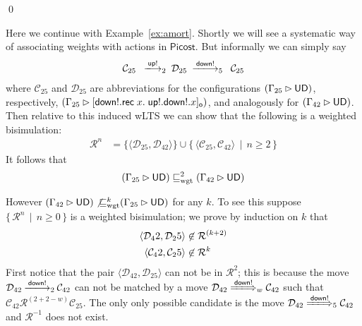 \documentclass{LMCS}
\newcommand{\pfn}[1]{\mathsf{#1}}  \newcommand{\cfn}[1]{\mathsf{#1}}  \newcommand{\ownfnt}[1]{{\mathsf{#1}}}
\newcommand{\picost}{\ensuremath{\pfn{Picost}}\xspace}
\newcommand{\with}{\mathbin \rhd}
\newcommand{\amort}[1]{\mathrel{\sqsubseteq_{\rm wgt}^{#1}}}
\def\pair(#1,#2){\langle #1 , #2 \rangle}\newcommand{\parrow}{ \mathbin{\rightharpoonup}}
\newcommand{\setof}[2]{\{ \, #1 \, \mid \, #2 \, \}}\newcommand{\sset}[1]{\{ {#1}  \}  }
\newcommand{\calR}{\mathbin{\mathcal{R}}}
\newcommand{\calC}{\mathcal{C}}
\newcommand{\calD}{\mathcal{D}}
\newcommand{\Crec}[2]{\pfn{rec}\;#1.\;#2}
\newcommand{\Cloc}[2]{[#1]_{\ownfnt{#2}}}
\newcommand{\ar}[1]{\mathbin{\xlongrightarrow{ #1}}}
\newcommand{\dar}[1]{\xLongrightarrow{\vspace{-2em}#1}}
\begin{document}
 \qed
\begin{exa}\label{def:amort.more}
  Here we continue with Example~\ref{ex:amort}. Shortly we will see a
  systematic way of associating weights with actions in \picost. But
  informally we can simply say
\begin{align*}
  \calC_{25} \;\; \ar{\Up!}_2 \;\calD_{25}\; \ar{\down!}_5 \;\;  \calC_{25} 
\end{align*}
where $\calC_{25}$ and $\calD_{25}$ are abbreviations for the configurations 
$ (\Gamma_{25} \with \UD)$, respectively,
$(\Gamma_{25} \with \Cloc{\down!.\Crec{x}{\Up!.\down!.x}}{o})$, 
and analogously for $(\Gamma_{42} \with \UD)$. Then relative to this induced 
wLTS we can show that the following is a weighted bisimulation:
\begin{align*}
  \calR^n &= \sset{\pair(\calD_{25},\calD_{42})} \cup 
             \setof{\pair(\calC_{25},\calC_{42})}{n \geq 2}
\end{align*}
It follows that
\begin{align*}
   (\Gamma_{25} \with \UD)  \amort{2} (\Gamma_{42} \with \UD)  
\end{align*}

However 
\begin{math}
  (\Gamma_{42} \with \UD)  \not{\amort{k}}  (\Gamma_{25} \with \UD) 
\end{math}
for any $k$. To see this suppose $\setof{\calR^n}{n \geq 0}$ is a weighted
bisimulation; we prove by induction on $k$ that
\begin{align}\label{eq:fixup}
\pair(\calD_{42}, \calD_{25}) &\not\in \calR^{(k+2)}\\
\pair(\calC_{42}, \calC_{25}) & \not\in \calR^k \notag
\end{align}
First notice that the pair $\pair(\calD_{42}, \calD_{25})$ can not be in
$\calR^2$; this is because the move 
\begin{math}
  \calD_{42} \ar{\down!}_2 \calC_{42}
\end{math}
can not be matched by a move
\begin{math}
    \calD_{42} \dar{\down!}_w \calC_{42}
\end{math}
such that 
\begin{math}
  \calC_{42} \calR^{(2 +2 - w)} \calC_{25}.
\end{math}
The only only possible candidate is the move
\begin{math}
    \calD_{42} \dar{\down!}_5 \calC_{42}
\end{math}
and $\calR^{-1}$ does not exist. 


\end{exa}
\end{document}
